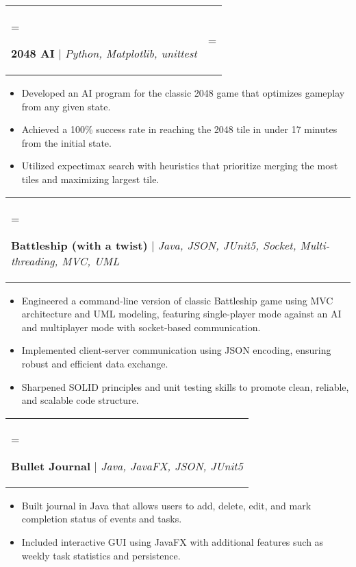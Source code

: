 \documentclass[letterpaper,11pt]{article}
\begin{document}
\begin{tabularx}{\textwidth}{ 
  >{\hsize=0.7\textwidth\linewidth=\textwidth\raggedright\arraybackslash}X 
  >{\hsize=0.3\textwidth\linewidth=\textwidth\raggedleft\arraybackslash}X}
  \hspace*{0.03mm} 
  {\textbf{2048 AI} $\vert$ \small{\textit{Python, Matplotlib, unittest}}} \\
\end{tabularx}
\vspace{-6.5mm}
\begin{itemize}[leftmargin=20pt, rightmargin=0cm]
    \item Developed an AI program for the classic 2048 game that optimizes gameplay from any given state.
    \item Achieved a 100\% success rate in reaching the 2048 tile in under 17 minutes from the initial state.
    \item Utilized expectimax search with heuristics that prioritize merging the most tiles and maximizing largest tile.
\end{itemize}

\begin{tabularx}{\textwidth}{ 
  >{\hsize=1\textwidth\linewidth=\textwidth\raggedright\arraybackslash}X}
  \hspace*{0.03mm} 
  {\textbf{Battleship (with a twist)} $\vert$ \small{\textit{Java, JSON, JUnit5, Socket, Multi-threading, MVC, UML}}}
\end{tabularx}
\vspace{-6.5mm}
\begin{itemize}[leftmargin=20pt, rightmargin=0cm]
    \item Engineered a command-line version of classic Battleship game using MVC architecture and UML modeling, featuring single-player mode against an AI and multiplayer mode with socket-based communication.
    \item Implemented client-server communication using JSON encoding, ensuring robust and efficient data exchange.
    \item Sharpened SOLID principles and unit testing skills to promote clean, reliable, and scalable code structure.
\end{itemize}

\begin{tabularx}{\textwidth}{ 
  >{\hsize=1\textwidth\linewidth=\textwidth\raggedright\arraybackslash}X}
  \hspace*{0.03mm} 
  {\textbf{Bullet Journal} $\vert$ \small{\textit{Java, JavaFX, JSON, JUnit5}}}
\end{tabularx}
\vspace{-6.5mm}
\begin{itemize}[leftmargin=20pt, rightmargin=0cm]
    \item Built journal in Java that allows users to add, delete, edit, and mark completion status of events and tasks.
    \item Included interactive GUI using JavaFX with additional features such as weekly task statistics and persistence.
\end{itemize}
\end{document}
